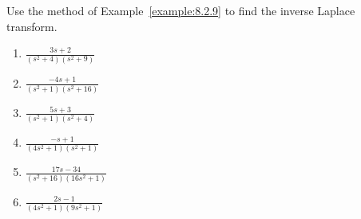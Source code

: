 \documentclass{ximera}
\begin{document}
\begin{problem}\label{exer:8.2.5}
 Use the method of Example~\ref{example:8.2.9}  to find the
inverse Laplace transform.

\begin{enumerate}
    \item $\frac{3s+2}{(s^2+4)(s^2+9)}$
    \item $\frac{-4s+1}{(s^2+1)(s^2+16)}$
    \item $\frac{5s+3}{(s^2+1)(s^2+4)}$
    \item $\frac{-s+1}{(4s^2+1)(s^2+1)}$
    \item $\frac{17s-34}{(s^2+16)(16s^2+1)}$
    \item $\frac{2s-1}{(4s^2+1)(9s^2+1)}$
\end{enumerate}
\end{problem}
\end{document}
